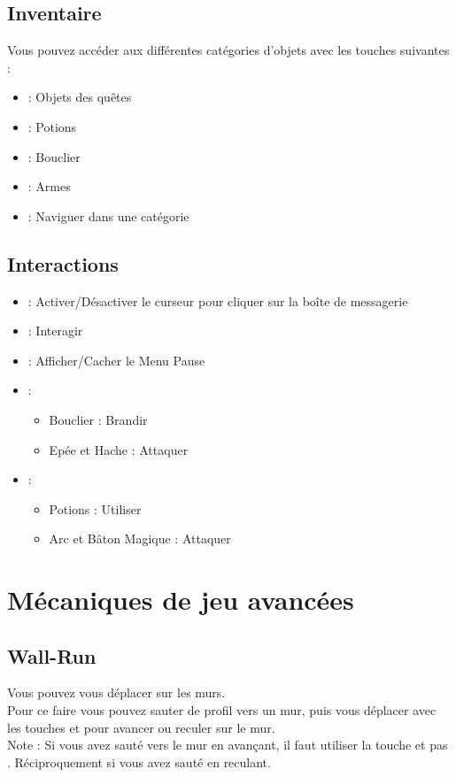 \documentclass[a4paper]{article}
\begin{document}
	\subsection{Inventaire}
	Vous pouvez accéder aux différentes catégories d'objets avec les touches suivantes : 
	\begin{itemize}
		\item {} : Objets des quêtes
		\item {} : Potions
		\item {} : Bouclier
		\item {} : Armes
		\item {} : Naviguer dans une catégorie
	\end{itemize}
	
	\subsection{Interactions}
	\begin{itemize}
		\item {} : Activer/Désactiver le curseur pour cliquer sur la boîte de messagerie
		\item {} : Interagir
		\item {} : Afficher/Cacher le Menu Pause
		\item {} :
		\begin{itemize}
			\item Bouclier : Brandir
			\item Epée et Hache : Attaquer
		\end{itemize}
		\item {} :
		\begin{itemize}
			\item Potions : Utiliser
			\item Arc et Bâton Magique : Attaquer
		\end{itemize}
	\end{itemize}
	
	\section{Mécaniques de jeu avancées}
	\subsection{Wall-Run}
	Vous pouvez vous déplacer sur les murs.
	\\
	Pour ce faire vous pouvez sauter de profil vers un mur, puis vous déplacer avec les touches  et  pour avancer ou reculer sur le mur.
	\\
	Note : Si vous avez sauté vers le mur en avançant, il faut utiliser la touche  et pas . Réciproquement si vous avez sauté en reculant.
\end{document}
